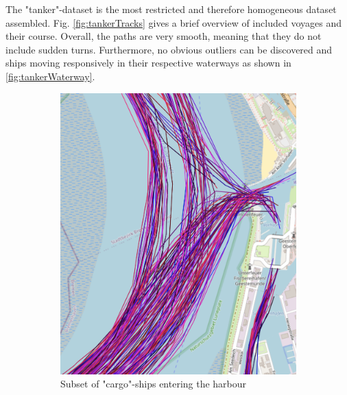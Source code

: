 The "tanker"-dataset is the most restricted and therefore homogeneous dataset assembled. Fig. \ref{fig:tankerTracks} gives a brief overview of included voyages and their course.
Overall, the paths are very smooth, meaning that they do not include sudden turns. Furthermore, no obvious outliers can be discovered and ships moving responsively in their respective waterways as shown in \ref{fig:tankerWaterway}.

\begin{figure}[H]
     \centering
     \begin{subfigure}[b]{0.48\textwidth}
         \centering
        \includegraphics[width=\textwidth]{images/ais/tracks/cargo_entering_fary.png}
         \caption{Subset of "cargo"-ships entering the harbour}
     \end{subfigure}
     \hfill
     \begin{subfigure}[b]{0.48\textwidth}
         \centering

\end{subfigure}
\end{figure}
